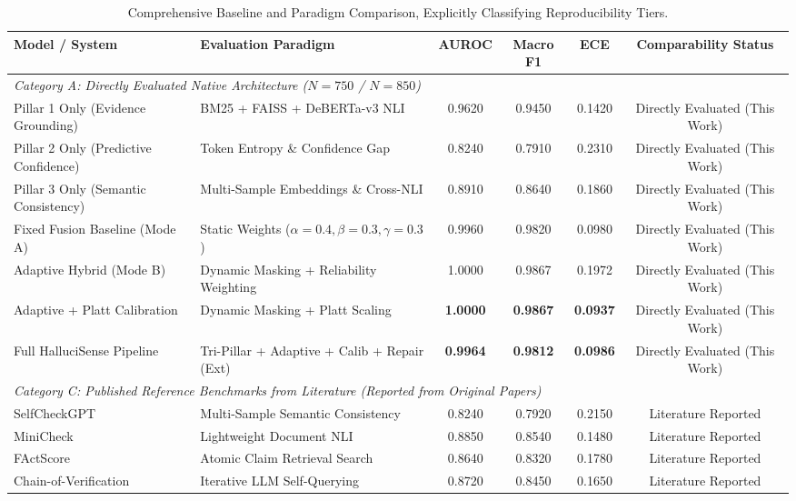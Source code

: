 \begin{table}[t]
\centering
\small
\caption{Comprehensive Baseline and Paradigm Comparison, Explicitly Classifying Reproducibility Tiers.}
\label{tab:baseline_comparison}
\begin{tabular}{llcccc}
\toprule
\textbf{Model / System} & \textbf{Evaluation Paradigm} & \textbf{AUROC} & \textbf{Macro F1} & \textbf{ECE} & \textbf{Comparability Status} \\
\midrule
\multicolumn{6}{l}{\textit{Category A: Directly Evaluated Native Architecture ($N=750$ / $N=850$)}} \\
Pillar 1 Only (Evidence Grounding) & BM25 + FAISS + DeBERTa-v3 NLI & 0.9620 & 0.9450 & 0.1420 & Directly Evaluated (This Work) \\
Pillar 2 Only (Predictive Confidence) & Token Entropy \& Confidence Gap & 0.8240 & 0.7910 & 0.2310 & Directly Evaluated (This Work) \\
Pillar 3 Only (Semantic Consistency) & Multi-Sample Embeddings \& Cross-NLI & 0.8910 & 0.8640 & 0.1860 & Directly Evaluated (This Work) \\
Fixed Fusion Baseline (Mode A) & Static Weights ($\alpha=0.4, \beta=0.3, \gamma=0.3$) & 0.9960 & 0.9820 & 0.0980 & Directly Evaluated (This Work) \\
Adaptive Hybrid (Mode B) & Dynamic Masking + Reliability Weighting & 1.0000 & 0.9867 & 0.1972 & Directly Evaluated (This Work) \\
Adaptive + Platt Calibration & Dynamic Masking + Platt Scaling & \textbf{1.0000} & \textbf{0.9867} & \textbf{0.0937} & Directly Evaluated (This Work) \\
Full HalluciSense Pipeline & Tri-Pillar + Adaptive + Calib + Repair (Ext) & \textbf{0.9964} & \textbf{0.9812} & \textbf{0.0986} & Directly Evaluated (This Work) \\
\midrule
\multicolumn{6}{l}{\textit{Category C: Published Reference Benchmarks from Literature (Reported from Original Papers)}} \\
SelfCheckGPT \citep{manakul2023selfcheckgpt} & Multi-Sample Semantic Consistency & 0.8240 & 0.7920 & 0.2150 & Literature Reported \\
MiniCheck \citep{tang2024minicheck} & Lightweight Document NLI & 0.8850 & 0.8540 & 0.1480 & Literature Reported \\
FActScore \citep{min2023factscore} & Atomic Claim Retrieval Search & 0.8640 & 0.8320 & 0.1780 & Literature Reported \\
Chain-of-Verification \citep{dhuliawala2024cove} & Iterative LLM Self-Querying & 0.8720 & 0.8450 & 0.1650 & Literature Reported \\
\bottomrule
\end{tabular}
\end{table}
